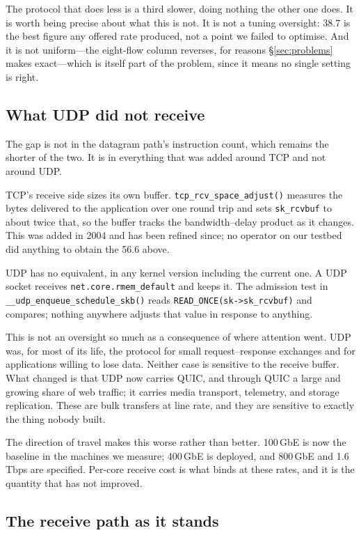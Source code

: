 The protocol that does less is a third slower, doing nothing the other one does.
It is worth being precise about what this is not. It is not a tuning oversight:
38.7 is the best figure any offered rate produced, not a point we failed to
optimise. And it is not uniform---the eight-flow column reverses, for reasons
\S\ref{sec:problems} makes exact---which is itself part of the problem, since it
means no single setting is right.

\subsection{What UDP did not receive}

The gap is not in the datagram path's instruction count, which remains the
shorter of the two. It is in everything that was added around TCP and not
around UDP.

TCP's receive side sizes its own buffer. \texttt{tcp\_rcv\_space\_adjust()}
measures the bytes delivered to the application over one round trip and sets
\texttt{sk\_rcvbuf} to about twice that, so the buffer tracks the
bandwidth--delay product as it changes. This was added in 2004 and has been
refined since; no operator on our testbed did anything to obtain the 56.6 above.

UDP has no equivalent, in any kernel version including the current one. A UDP
socket receives \texttt{net.core.rmem\_default} and keeps it. The admission test
in \texttt{\_\_udp\_enqueue\_schedule\_skb()} reads
\texttt{READ\_ONCE(sk->sk\_rcvbuf)} and compares; nothing anywhere adjusts that
value in response to anything.

This is not an oversight so much as a consequence of where attention went. UDP
was, for most of its life, the protocol for small request--response exchanges
and for applications willing to lose data. Neither case is sensitive to the
receive buffer. What changed is that UDP now carries QUIC, and through QUIC a
large and growing share of web traffic; it carries media transport, telemetry,
and storage replication. These are bulk transfers at line rate, and they are
sensitive to exactly the thing nobody built.

The direction of travel makes this worse rather than better. 100\,GbE is now the
baseline in the machines we measure; 400\,GbE is deployed, and 800\,GbE and
1.6\,Tbps are specified. Per-core receive cost is what binds at these rates, and
it is the quantity that has not improved.

\subsection{The receive path as it stands}

